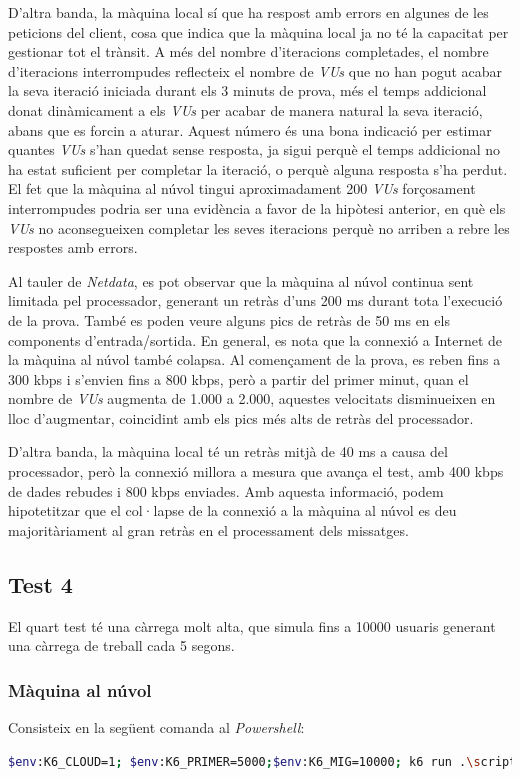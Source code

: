 D'altra banda, la màquina local sí que ha respost amb errors en algunes de les peticions del client, cosa que indica que la màquina local ja no té la capacitat per gestionar tot el trànsit. A més del nombre d'iteracions completades, el nombre d'iteracions interrompudes reflecteix el nombre de \textit{VUs} que no han pogut acabar la seva iteració iniciada durant els 3 minuts de prova, més el temps addicional donat dinàmicament a els \textit{VUs} per acabar de manera natural la seva iteració, abans que es forcin a aturar. Aquest número és una bona indicació per estimar quantes \textit{VUs} s'han quedat sense resposta, ja sigui perquè el temps addicional no ha estat suficient per completar la iteració, o perquè alguna resposta s'ha perdut. El fet que la màquina al núvol tingui aproximadament 200 \textit{VUs} forçosament interrompudes podria ser una evidència a favor de la hipòtesi anterior, en què els \textit{VUs} no aconsegueixen completar les seves iteracions perquè no arriben a rebre les respostes amb errors.

Al tauler de \textit{Netdata}, es pot observar que la màquina al núvol continua sent limitada pel processador, generant un retràs d'uns 200 ms durant tota l'execució de la prova. També es poden veure alguns pics de retràs de 50 ms en els components d'entrada/sortida. En general, es nota que la connexió a Internet de la màquina al núvol també colapsa. Al començament de la prova, es reben fins a 300 kbps i s'envien fins a 800 kbps, però a partir del primer minut, quan el nombre de \textit{VUs} augmenta de 1.000 a 2.000, aquestes velocitats disminueixen en lloc d'augmentar, coincidint amb els pics més alts de retràs del processador.

D'altra banda, la màquina local té un retràs mitjà de 40 ms a causa del processador, però la connexió millora a mesura que avança el test, amb 400 kbps de dades rebudes i 800 kbps enviades. Amb aquesta informació, podem hipotetitzar que el col·lapse de la connexió a la màquina al núvol es deu majoritàriament al gran retràs en el processament dels missatges.

\newpage
\subsection{Test 4}

El quart test té una càrrega molt alta, que simula fins a 10000 usuaris generant una càrrega de treball cada 5 segons.

\subsubsection{Màquina al núvol}
Consisteix en la següent comanda al \textit{Powershell}:
\begin{lstlisting}[language=bash, caption=Test 4 al núvol]
    $env:K6_CLOUD=1; $env:K6_PRIMER=5000;$env:K6_MIG=10000; k6 run .\script.js
\end{lstlisting}

